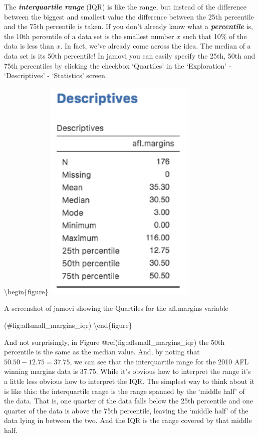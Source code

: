 \documentclass[
]{book}
\begin{document}
The \textbf{\emph{interquartile range}} (IQR) is like the range, but instead of the difference between the biggest and smallest value the difference between the 25th percentile and the 75th percentile is taken. If you don't already know what a \textbf{\emph{percentile}} is, the 10th percentile of a data set is the smallest number \(x\) such that 10\% of the data is less than \(x\). In fact, we've already come across the idea. The median of a data set is its 50th percentile! In jamovi you can easily specify the 25th, 50th and 75th percentiles by clicking the checkbox `Quartiles' in the `Exploration' - `Descriptives' - `Statistics' screen.

\textbackslash begin\{figure\}
\includegraphics[width=2.86in]{img/descriptives/aflsmall_margins_iqr}

\caption{A screenshot of jamovi showing the Quartiles for the afl.margins variable }

(\#fig:aflsmall\_margins\_iqr)
\textbackslash end\{figure\}

And not surprisingly, in Figure @ref(fig:aflsmall\_margins\_iqr) the 50th percentile is the same as the median value. And, by noting that \(50.50 - 12.75 = 37.75\), we can see that the interquartile range for the 2010 AFL winning margins data is 37.75. While it's obvious how to interpret the range it's a little less obvious how to interpret the IQR. The simplest way to think about it is like this: the interquartile range is the range spanned by the `middle half' of the data. That is, one quarter of the data falls below the 25th percentile and one quarter of the data is above the 75th percentile, leaving the `middle half' of the data lying in between the two. And the IQR is the range covered by that middle half.
\end{document}
